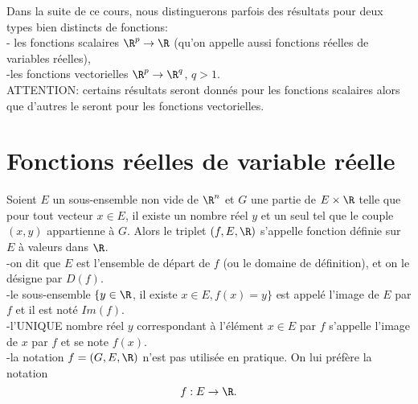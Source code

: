 \documentclass[class=report,crop=false]{standalone}
\begin{document}
Dans la suite de ce cours, nous distinguerons parfois des résultats pour deux types bien distincts de fonctions:\\
- les fonctions scalaires $\R^p \rightarrow \R$ (qu'on appelle aussi fonctions réelles de variables réelles),\\
-les fonctions vectorielles $\R^p \rightarrow \R^q$, $q>1$.\\

\noindent ATTENTION: certains résultats seront donnés pour les fonctions scalaires alors que d'autres
le seront pour les fonctions vectorielles.

\section{Fonctions réelles de variable réelle}
\begin{definition}
\textcolor[rgb]{0.73,0.00,0.00}{
\noindent Soient $E$ un sous-ensemble non vide de $\R^n$ et $G$ une partie de $E \times \R$ telle 
que pour tout vecteur $x \in E$, il existe un nombre réel $y$ et un seul tel que le couple $(x,y)$ 
appartienne à $G$. Alors le triplet $(f,E,\R)$ s'appelle fonction définie sur $E$ à valeurs dans $\R$.\\
-on dit que $E$ est l'ensemble de départ de $f$ (ou le domaine de définition), et on le désigne par $D(f)$.\\
-le sous-ensemble $\lbrace y \in \R$, il existe $x\in E, f(x)=y \rbrace$ est appelé l'image de $E$ par $f$ et il est noté $Im(f)$.\\
-l'UNIQUE nombre réel $y$ correspondant à l'élément $x \in E$ par $f$ s'appelle l'image de $x$ par
$f$ et se note $f(x)$.\\
-la notation $f=(G,E,\R)$ n'est pas utilisée en pratique. On lui préfère la notation
\begin{equation*}
f:E \rightarrow \R.
\end{equation*}
}
\end{definition}
\end{document}
